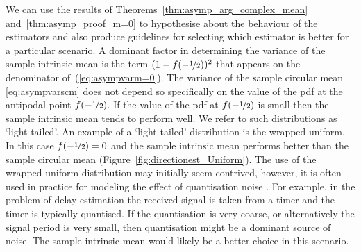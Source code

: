 \documentclass[journal]{IEEEtran}
\begin{document}
We can use the results of Theorems~\ref{thm:asymp_arg_complex_mean} and~\ref{thm:asymp_proof_m=0} to hypothesise about the behaviour of the estimators and also produce guidelines for selecting which estimator is better for a particular scenario.  A dominant factor in determining the variance of the sample intrinsic mean is the term $(1 - f(-\nicefrac{1}{2}))^2$ that appears on the denominator of~(\ref{eq:asympvarm=0}).  The variance of the sample circular mean \eqref{eq:asympvarscm} does not depend so specifically on the value of the pdf at the antipodal point $f(-\nicefrac{1}{2})$. If the value of the pdf at $f(-\nicefrac{1}{2})$ is small then the sample intrinsic mean tends to perform well. We refer to such distributions as `light-tailed'. An example of a `light-tailed' distribution is the wrapped uniform. In this case $f(-\nicefrac{1}{2}) = 0$ and the sample intrinsic mean performs better than the sample circular mean (Figure~\ref{fig:directionest_Uniform}). The use of the wrapped uniform distribution may initially seem contrived, however, it is often used in practice for modeling the effect of quantisation noise \cite{Widrow-Kollar_quant_noise_2008}.  For example, in the problem of delay estimation \cite{Elton_circstat_radar_pulse_1994} the received signal is taken from a timer and the timer is typically quantised.  If the quantisation is very coarse, or alternatively the signal period is very small, then quantisation might be a dominant source of noise.  The sample intrinsic mean would likely be a better choice in this scenario. 
\end{document}
